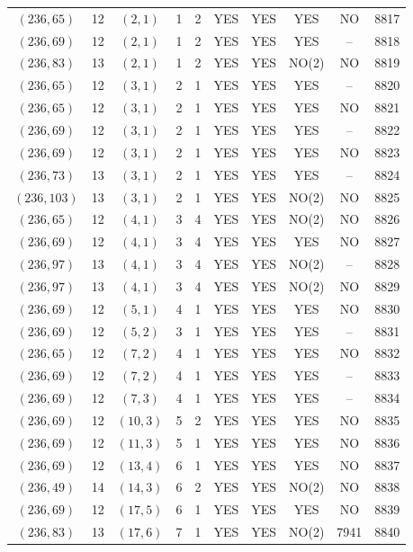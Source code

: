 \begin{longtable}{|c|c|c|c|c|c|c|c|c|c|}
$(236, 65)$ & 12 & $(2, 1)$ & 1 & 2 & YES & YES & YES & NO & 8817\\
$(236, 69)$ & 12 & $(2, 1)$ & 1 & 2 & YES & YES & YES & -- & 8818\\
$(236, 83)$ & 13 & $(2, 1)$ & 1 & 2 & YES & YES & NO(2) & NO & 8819\\
$(236, 65)$ & 12 & $(3, 1)$ & 2 & 1 & YES & YES & YES & -- & 8820\\
$(236, 65)$ & 12 & $(3, 1)$ & 2 & 1 & YES & YES & YES & NO & 8821\\
$(236, 69)$ & 12 & $(3, 1)$ & 2 & 1 & YES & YES & YES & -- & 8822\\
$(236, 69)$ & 12 & $(3, 1)$ & 2 & 1 & YES & YES & YES & NO & 8823\\
$(236, 73)$ & 13 & $(3, 1)$ & 2 & 1 & YES & YES & YES & -- & 8824\\
$(236, 103)$ & 13 & $(3, 1)$ & 2 & 1 & YES & YES & NO(2) & NO & 8825\\
$(236, 65)$ & 12 & $(4, 1)$ & 3 & 4 & YES & YES & NO(2) & NO & 8826\\
$(236, 69)$ & 12 & $(4, 1)$ & 3 & 4 & YES & YES & YES & NO & 8827\\
$(236, 97)$ & 13 & $(4, 1)$ & 3 & 4 & YES & YES & NO(2) & -- & 8828\\
$(236, 97)$ & 13 & $(4, 1)$ & 3 & 4 & YES & YES & NO(2) & NO & 8829\\
$(236, 69)$ & 12 & $(5, 1)$ & 4 & 1 & YES & YES & YES & NO & 8830\\
$(236, 69)$ & 12 & $(5, 2)$ & 3 & 1 & YES & YES & YES & -- & 8831\\
$(236, 65)$ & 12 & $(7, 2)$ & 4 & 1 & YES & YES & YES & NO & 8832\\
$(236, 69)$ & 12 & $(7, 2)$ & 4 & 1 & YES & YES & YES & -- & 8833\\
$(236, 69)$ & 12 & $(7, 3)$ & 4 & 1 & YES & YES & YES & -- & 8834\\
$(236, 69)$ & 12 & $(10, 3)$ & 5 & 2 & YES & YES & YES & NO & 8835\\
$(236, 69)$ & 12 & $(11, 3)$ & 5 & 1 & YES & YES & YES & NO & 8836\\
$(236, 69)$ & 12 & $(13, 4)$ & 6 & 1 & YES & YES & YES & NO & 8837\\
$(236, 49)$ & 14 & $(14, 3)$ & 6 & 2 & YES & YES & NO(2) & NO & 8838\\
$(236, 69)$ & 12 & $(17, 5)$ & 6 & 1 & YES & YES & YES & NO & 8839\\
$(236, 83)$ & 13 & $(17, 6)$ & 7 & 1 & YES & YES & NO(2) & 7941 & 8840\\

\end{longtable}
